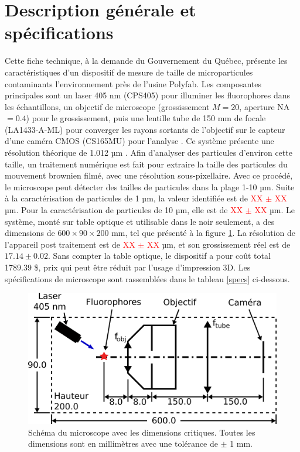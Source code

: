 \documentclass[11pt,letterpaper]{article}
\begin{document}
\section{Description générale et spécifications}

Cette fiche technique, à la demande du Gouvernement du Québec, présente les caractéristiques 
d'un dispositif de mesure de taille de microparticules contaminants l'environnement près de 
l'usine Polyfab. Les composantes principales sont un laser 405 nm (CPS405)
pour illuminer les fluorophores dans les échantillons, un objectif de microscope (grossissement 
$M = 20$, aperture NA $= 0.4$) pour le grossissement, puis une lentille tube de 150 mm de focale
(LA1433-A-ML) pour converger les rayons sortants de l'objectif sur le capteur d'une caméra CMOS 
(CS165MU) pour l'analyse \cite{noauthor_thorlabs_2024}. Ce système présente une résolution
théorique de 1.012 µm \cite{rouillon_travail_2024}. Afin d'analyser des particules d'environ cette taille, un traitement
numérique est fait pour extraire la taille des particules du mouvement brownien filmé, avec 
une résolution sous-pixellaire. Avec ce procédé, le microscope peut détecter des tailles de 
particules dans la plage 1-10 µm. Suite à la caractérisation de particules 
de 1 µm, la valeur identifiée est de \textcolor{red}{XX $\pm$ XX} µm.
Pour la caractérisation de particules de 10 µm, elle est de 
\textcolor{red}{XX $\pm$ XX} µm. Le système, monté sur table optique et utilisable dans le noir 
seulement, a des dimensions de $600 \times 90 \times 200$ mm, tel que présenté à 
la figure \ref{schema_micro}. La résolution de l'appareil post traitement est de \textcolor{red}{XX $\pm$ XX} µm, et
son grossissement réel est de $17.14 \pm 0.02$. Sans compter la table optique, le dispositif a pour coût total 1789.39 \$, prix qui
peut être réduit par l'usage d'impression 3D. Les spécifications de microscope sont rassemblées dans le
tableau \ref{specs} ci-dessous.

\begin{figure}[H]
  \centering
  \includegraphics[scale=2.8]{schema_fiche_tech.png}
  \caption{Schéma du microscope avec les dimensions critiques. Toutes les dimensions sont en millimètres avec une tolérance de $\pm$ 1 mm.}
  \label{schema_micro}
\end{figure}
\end{document}

